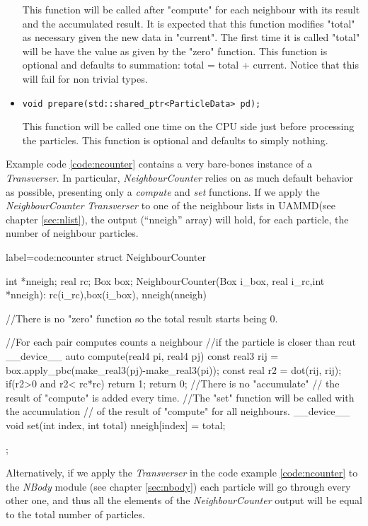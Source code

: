 \documentclass[ twoside,openright,titlepage,numbers=noenddot,%
headinclude,footinclude,cleardoublepage=empty,abstract=on,
BCOR=5mm,paper=b5,fontsize=11pt, dvipsnames
]{scrreprt}
\def\ucpp{uammd_cpp_lexer.py:UAMMDCppLexer -x}
\newcommand{\uammd}{\gls{UAMMD}\xspace}
\begin{document}
\begin{itemize}
   
  This function will be called after "compute" for each neighbour with its result and the accumulated result.
  It is expected that this function modifies "total" as necessary given the new data in "current".
  The first time it is called "total" will be have the value as given by the "zero" function.
  This function is optional and defaults to summation: total = total + current. Notice that this will fail for non trivial types.
     
\item \texttt{void prepare(std::shared_ptr<ParticleData> pd);}

  
  This function will be called one time on the CPU side just before processing the particles.
  This function is optional and defaults to simply nothing.
 \end{itemize}

Example code \ref{code:ncounter} contains a very bare-bones instance of a \emph{Transverser}. In particular, \emph{NeighbourCounter} relies on as much default behavior as possible, presenting only a \emph{compute} and \emph{set} functions.
If we apply the \emph{NeighbourCounter} \emph{Transverser} to one of the neighbour lists in \uammd (see chapter \ref{sec:nlist}), the output (``nneigh'' array) will hold, for each particle, the number of neighbour particles.
\begin{code2}{label=code:ncounter}
struct NeighbourCounter{
  int *nneigh;
  real rc;
  Box box;
  NeighbourCounter(Box i_box, real i_rc,int *nneigh):
    rc(i_rc),box(i_box),
    nneigh(nneigh){}

  //There is no "zero" function so the total result starts being 0.
  
  //For each pair computes counts a neighbour 
  //if the particle is closer than rcut
  __device__ auto compute(real4 pi, real4 pj){
    const real3 rij = box.apply_pbc(make_real3(pj)-make_real3(pi));
    const real r2 = dot(rij, rij);
    if(r2>0 and r2< rc*rc){
      return 1;
    }
    return 0;
  }
  //There is no "accumulate"
  // the result of "compute" is added every time.
  //The "set" function will be called with the accumulation
  // of the result of "compute" for all neighbours. 
  __device__ void set(int index, int total){
    nneigh[index] = total;
  }
};
\end{code2}
Alternatively, if we apply the \emph{Transverser} in the code example \ref{code:ncounter} to the \emph{NBody} module (see chapter \ref{sec:nbody}) each particle will go through every other one, and thus all the elements of the \emph{NeighbourCounter} output will be equal to the total number of particles.
\end{document}
